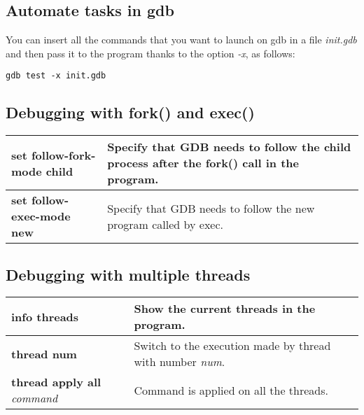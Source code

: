 \subsection{Automate tasks in gdb}
You can insert all the commands that you want to launch on gdb in a file \textit{init.gdb} and then pass it to the program thanks to the option \textit{-x}, as follows:
\begin{lstlisting}[linewidth=110pt, basicstyle=\footnotesize\sffamily,]
gdb test -x init.gdb
\end{lstlisting}

\subsection{Debugging with fork() and exec()}
\begin{table}[h]
\footnotesize\centering
\begin{tabular}{|l|l|}
\hline
{\textbf{set follow-fork-mode child}} & {Specify that GDB needs to follow the child process after the fork() call in the program.}\\
\hline
{\textbf{set follow-exec-mode new}} & {Specify that GDB needs to follow the new program called by exec.}\\
\hline
\end{tabular}
\end{table}
\vspace{5cm}
\subsection{Debugging with multiple threads}
\begin{table}[h]
\footnotesize\centering
\begin{tabular}{|l|l|}
\hline
{\textbf{info threads}} & {Show the current threads in the program.}\\
\hline
{\textbf{thread num}} & {Switch to the execution made by thread with number \textit{num}.}\\
{\textbf{thread apply all} \textit{command}} & {Command is applied on all the threads.}\\
\hline
\end{tabular}
\end{table}